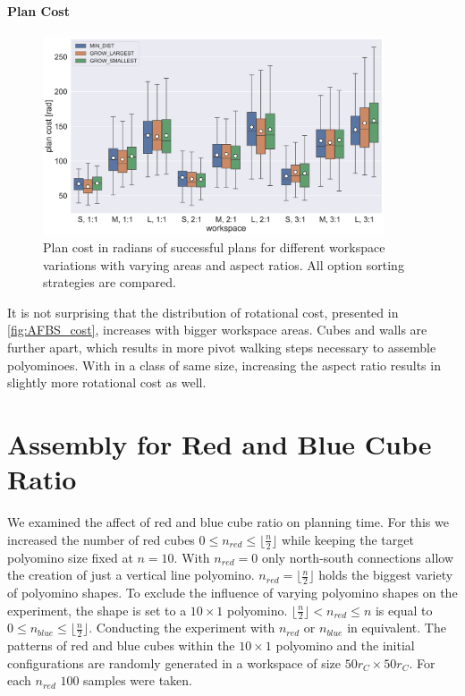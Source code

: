 \paragraph{Plan Cost} 

\begin{figure}
	\centering
	\includegraphics[width=0.9\textwidth]{figures/plots/AFBS_cost.pdf}
	\caption[Plan cost for different workspace variations]{Plan cost in radians of successful plans for different workspace variations with varying areas and aspect ratios. All option sorting strategies are compared.}
	\label{fig:AFBS_cost}
\end{figure}

It is not surprising that the distribution of rotational cost, presented in \autoref{fig:AFBS_cost}, increases with bigger workspace areas.
Cubes and walls are further apart, which results in more pivot walking steps necessary to assemble polyominoes.
With in a class of same size, increasing the aspect ratio results in slightly more rotational cost as well.





\section{Assembly for Red and Blue Cube Ratio}
\label{sec:AFNR}

We examined the affect of red and blue cube ratio on planning time.
For this we increased the number of red cubes $0 \leq n_\textit{red} \leq \lfloor \frac{n}{2}\rfloor$ while keeping the target polyomino size fixed at $n = 10$.
With $n_\textit{red} = 0$ only north-south connections allow the creation of just a vertical line polyomino.
$n_\textit{red} = \lfloor \frac{n}{2}\rfloor$ holds the biggest variety of polyomino shapes.
To exclude the influence of varying polyomino shapes on the experiment, the shape is set to a $10 \times 1$ polyomino.
$\lfloor \frac{n}{2}\rfloor < n_\textit{red} \leq n$ is equal to $0 \leq n_\textit{blue} \leq \lfloor \frac{n}{2}\rfloor$.
Conducting the experiment with $n_\textit{red}$ or $n_\textit{blue}$ in equivalent.
The patterns of red and blue cubes within the $10 \times 1$ polyomino and the initial configurations are randomly generated in a workspace of size $50 r_C \times 50 r_C$.
For each $n_\textit{red}$ $100$ samples were taken.

